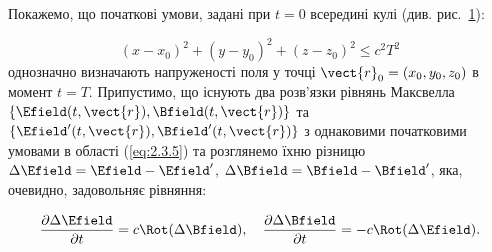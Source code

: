 Покажемо, що початкові умови, задані при \( t = 0 \) всередині кулі (див. рис.~\ref{tikz:Unity}):

\begin{equation}
(x - x_0)^2 + (y - y_0)^2 + (z - z_0)^2 \leq c^2 T^2 \label{eq:2.3.5}
\end{equation}
однозначно визначають напруженості поля у точці \( \vect{r}_0 = (x_0, y_0, z_0) \) в момент \( t = T \). Припустимо, що існують два розв’язки рівнянь
Максвелла \( \{\Efield(t, \vect{r}), \Bfield(t, \vect{r})\} \) та \( \{\Efield'(t, \vect{r}), \Bfield'(t, \vect{r})\} \) з однаковими початковими
умовами в області (\ref{eq:2.3.5}) та розглянемо їхню різницю \( \Delta \Efield = \Efield - \Efield' \), \( \Delta \Bfield = \Bfield - \Bfield'
\), яка, очевидно, задовольняє рівняння:

\begin{equation*}
\frac{\partial \Delta \Efield}{\partial t} = c  \Rot(\Delta \Bfield), \quad \frac{\partial \Delta \Bfield}{\partial t} = -c
\Rot(\Delta \Efield).
\end{equation*}

\begin{figure}[ht!]\centering
{}
\caption{}
\label{tikz:Unity}
\end{figure}

